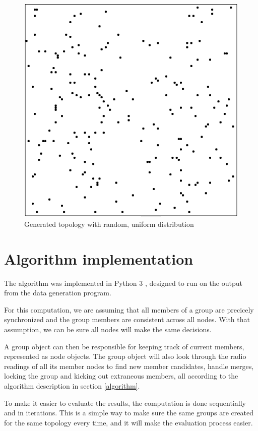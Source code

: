 \documentclass[a4paper,UKenglish]{report}
\begin{document}
\begin{figure}
	\center
	\includegraphics[scale=0.4]{Images/randomtopology.png}
	\caption{Generated topology with random, uniform distribution}
	\label{fig:randtop}
\end{figure}

\section{Algorithm implementation}
The algorithm was implemented in Python 3 \cite{Python3}, designed to run on the output from 
the data generation program.

For this computation, we are assuming that all members of a group are precicely synchronized
and the group members are consistent across all nodes. With that assumption, we can be sure
all nodes will make the same decisions. 

A group object can then be responsible for keeping track of current members,
represented as node objects. The group object will also look through the radio readings
of all its member nodes to find new member candidates, handle merges, locking the group and
kicking out extraneous members, all according to the algorithm description in section
\ref{algorithm}.
   

To make it easier to evaluate the results, the computation is done sequentially
and in iterations. This is a simple way to make sure the same groups are created
for the same topology every time, and it will make the evaluation process easier. 
\end{document}
